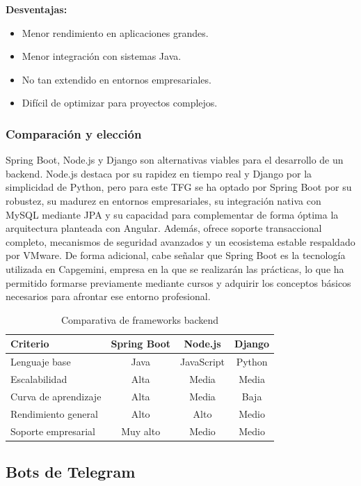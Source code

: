 \textbf{Desventajas:}
\begin{itemize}
    \item Menor rendimiento en aplicaciones grandes.
    \item Menor integración con sistemas Java.
    \item No tan extendido en entornos empresariales.
    \item Difícil de optimizar para proyectos complejos.
\end{itemize}

\subsubsection{Comparación y elección}
Spring Boot, Node.js y Django son alternativas viables para el desarrollo de un backend. Node.js destaca por su rapidez en tiempo real y Django por la simplicidad de Python, pero para este TFG se ha optado por Spring Boot por su robustez, su madurez en entornos empresariales, su integración nativa con MySQL mediante JPA y su capacidad para complementar de forma óptima la arquitectura planteada con Angular. Además, ofrece soporte transaccional completo, mecanismos de seguridad avanzados y un ecosistema estable respaldado por VMware. De forma adicional, cabe señalar que Spring Boot es la tecnología utilizada en Capgemini, empresa en la que se realizarán las prácticas, lo que ha permitido formarse previamente mediante cursos y adquirir los conceptos básicos necesarios para afrontar ese entorno profesional.

\begin{table}[H]
\centering
\begin{tabular}{|l|c|c|c|}
\hline
\textbf{Criterio} & \textbf{Spring Boot} & \textbf{Node.js} & \textbf{Django} \\ \hline
Lenguaje base & Java & JavaScript & Python \\ \hline
Escalabilidad & Alta & Media & Media \\ \hline
Curva de aprendizaje & Alta & Media & Baja \\ \hline
Rendimiento general & Alto & Alto & Medio \\ \hline
Soporte empresarial & Muy alto & Medio & Medio \\ \hline
\end{tabular}
\caption{Comparativa de frameworks backend}
\end{table}


\subsection{Bots de Telegram}

